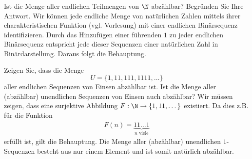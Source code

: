 \begin{example}
Ist die Menge aller endlichen Teilmengen von $\N$ abzählbar? Begründen Sie Ihre Antwort.
\tcblower
Wir können jede endliche Menge von natürlichen Zahlen mittels ihrer charakteristischen Funktion (vgl. Vorlesung) mit einer endlichen Binärsequenz identifizieren. Durch das Hinzufügen einer führenden $1$ zu jeder endlichen Binärsequenz entspricht jede dieser Sequenzen einer natürlichen Zahl in Binärdarstellung. Daraus folgt die Behauptung.
\end{example}

\begin{example}
Zeigen Sie, dass die Menge
\[
U=\{1,11,111,1111,\dots \}
\]
aller endlichen Sequenzen von Einsen abzählbar ist. Ist die Menge aller (abzählbar) unendlichen Sequenzen von Einsen auch abzählbar?
\tcblower
Wir müssen zeigen, dass eine surjektive Abbildung $F:\N\to \{1,11,\dots\}$ existiert. Da dies z.B. für die Funktion
	\begin{align*}
	F(n)=\underbrace{11\dots 1}_{n\text{ viele}}
	\end{align*}
	erfüllt ist, gilt die Behauptung. Die Menge aller (abzählbar) unendlichen $1$-Sequenzen besteht aus nur einem Element und ist somit natürlich abzählbar.
\end{example}